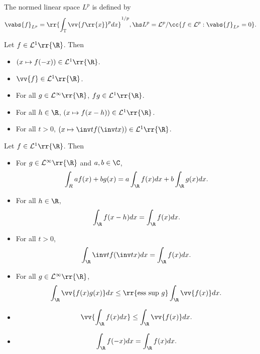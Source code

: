 \documentclass{article}
\begin{document}
\begin{definition}
  The normed linear space $L^p$ is defined by
  \begin{align*}
    \vabs{f}_{L^p} = \rr{\int_{\mathbb T} \vv{f\rr{x}}^p dx}^{1/p},\hs
    L^p = \mathcal L^p / \cc{f\in\mathcal L^p : \vabs{f}_{L^p} = 0}.
  \end{align*}
\end{definition}

\begin{theorem}
  Let $f\in\mathcal L^1\rr{\R}$. Then
  \begin{itemize}
    \item $(x\mapsto f(-x))\in\mathcal L^1\rr{\R}$.
    \item $\vv{f}\in\mathcal L^1\rr{\R}$.
    \item For all $g\in\mathcal L^{\infty}\rr{\R}$, $fg\in\mathcal L^1\rr{\R}$.
    \item For all $h\in\R$, $(x\mapsto f(x-h))\in\mathcal L^1\rr{\R}$.
    \item For all $t>0$, $(x\mapsto \inv t f(\inv t x))\in\mathcal L^1\rr{\R}$.
  \end{itemize}
\end{theorem}

\begin{theorem}
  Let $f\in\mathcal L^1\rr{\R}$. Then
  \begin{itemize}
    \item For $g\in\mathcal L^{\infty}\rr{\R}$ and $a,b\in\C$,
      \begin{align*}
        \int_R af(x) + bg(x) = a\int_\R f(x)dx + b\int_\R g(x) dx.
      \end{align*}
    \item For all $h\in\R$,
      \begin{align*}
        \int_\R f(x-h)dx = \int_\R f(x)dx.
      \end{align*}
    \item For all $t>0$,
      \begin{align*}
        \int_\R \inv tf(\inv tx) dx = \int_\R f(x) dx.
      \end{align*}
    \item For all $g\in\mathcal L^{\infty}\rr{\R}$,
      \begin{align*}
        \int_\R \vv{f(x)g(x)} dx \leq \rr{\text{ess sup } g}
        \int_\R \vv{f(x)} dx.
      \end{align*}
    \item \begin{align*}
        \vv{\int_\R f(x) dx}\leq \int_\R \vv{f(x)} dx.
      \end{align*}
    \item \begin{align*}
        \int_\R f(-x) dx = \int_\R f(x) dx.
      \end{align*}
  \end{itemize}
\end{theorem}
\end{document}
